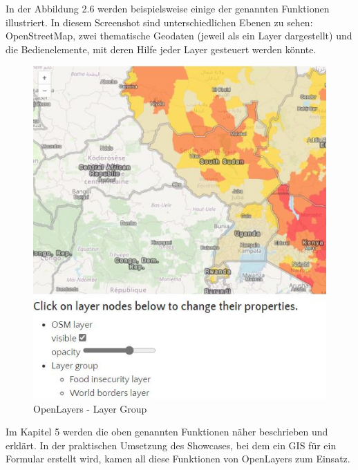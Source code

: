 In der Abbildung 2.6 werden beispielsweise einige der genannten Funktionen illustriert. In diesem Screenshot sind unterschiedlichen Ebenen zu sehen: OpenStreetMap, zwei thematische Geodaten (jeweil als ein Layer dargestellt) und die Bedienelemente, mit deren Hilfe jeder Layer gesteuert werden könnte.

\begin{figure}[ht]
  \centering
  \includegraphics[width=\linewidth]{images/layer-group.JPG}
  \caption{OpenLayers - Layer Group \citep{openlayers_examples}}
  \label{fig:meineabbildung}
\end{figure}
Im Kapitel 5 werden die oben genannten Funktionen näher beschrieben und erklärt. In der praktischen Umsetzung des Showcases, bei dem ein GIS für ein Formular erstellt wird, kamen all diese Funktionen von OpenLayers zum Einsatz. 



